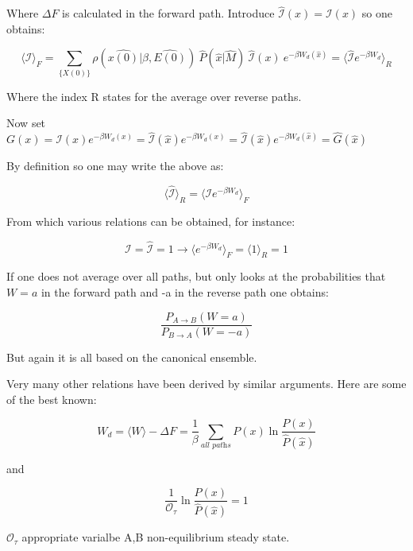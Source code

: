 \documentclass{article}
\begin{document}
Where $\Delta F $ is calculated in the forward path. Introduce $\hat{\mathcal{I}}(x) = \mathcal{I}(x) $ so one obtains:

$$ \langle \mathcal{I} \rangle_F =\sum_{\{ X(0)\} } \rho(\hat{x(0)}| \beta, \hat{E(0)} ) \ \hat{P}(\hat{x}|\hat{M}) \ \hat{\mathcal{I}}(x) \ e^{-\beta W_d(\hat{x})} = \langle \hat{\mathcal{I}} e^{-\beta W_d} \rangle_R $$

Where the index R states for the average over reverse paths.

Now set $G(x) = \mathcal{I}(x) e^{-\beta W_d(x)} = \hat{\mathcal{I}}(\hat{x}) e^{-\beta W_d(x)} =  \hat{\mathcal{I}}(\hat{x}) e^{-\beta W_d(\hat{x})} = \hat{G}(\hat{x}) $

By definition so one may write the above as:

\begin{equation}
\langle \hat{\mathcal{I}} \rangle_R = \langle \mathcal{I} e^{-\beta W_d} \rangle_F
\end{equation}

From which various relations can be obtained, for instance:

$$ \mathcal{I} = \hat{\mathcal{I}} = 1 \rightarrow \langle e^{-\beta W_d} \rangle_F = \langle 1 \rangle_R = 1$$

If one does not average over all paths, but only looks at the probabilities that $W=a$ in the forward path and -a in the reverse path one obtains:

$$\frac{P_{A \to B}(W=a)}{{P_{B \to A}(W=-a)}}$$

But again it is all based on the canonical ensemble.

Very many other relations have been derived by similar arguments. Here are some of the best known:

$$W_d = \langle W \rangle - \Delta F = \frac{1}{\beta} \sum_{\textit{all paths}} P(x) \ln \frac{P(x)}{\hat{P}(\hat{x})}$$

and

$$\frac{1}{\mathcal{O}_{\tau}} \ln \frac{P(x)}{\hat{P}(\hat{x})} = 1 $$

$\mathcal{O}_{\tau}$ appropriate varialbe A,B non-equilibrium steady state.
\end{document}
